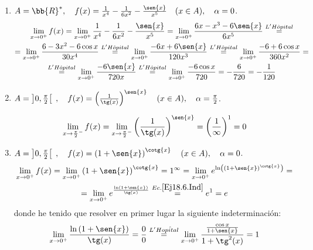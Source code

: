 \begin{ejercicio}
\begin{enumerate}
        \item $A = \bb{R}^\ast,\quad f(x)=\frac{1}{x^4}-\frac{1}{6x^2}-\frac{\sen{x}}{x^5}\quad (x\in A),\quad \alpha = 0$.
        \begin{multline*}
            \lim_{x\to0^+}f(x)
            =\lim_{x\to0^+}\frac{1}{x^4}-\frac{1}{6x^2}-\frac{\sen{x}}{x^5}
            = \lim_{x\to0^+} \frac{6x-x^3-6\sen{x}}{6x^5}
            \stackrel{L'H\hat{o}pital}{=}\\=
            \lim_{x\to0^+} \frac{6-3x^2-6\cos{x}}{30x^4}
            \stackrel{L'H\hat{o}pital}{=}
            \lim_{x\to0^+} \frac{-6x+6\sen{x}}{120x^3}
            \stackrel{L'H\hat{o}pital}{=}
            \lim_{x\to0^+} \frac{-6+6\cos{x}}{360x^2}
            = \\ \stackrel{L'H\hat{o}pital}{=}
            \lim_{x\to0^+} \frac{-6\sen{x}}{720x}
            \stackrel{L'H\hat{o}pital}{=}
            \lim_{x\to0^+} \frac{-6\cos{x}}{720} = -\frac{6}{720} = -\frac{1}{120}
        \end{multline*}
        

        \item $A = \left] 0, \frac{\pi}{2}\right[\;,\quad f(x)=\left(\frac{1}{\tg(x)}\right)^{\sen{x}}\quad (x\in A),\quad \alpha = \frac{\pi}{2}$.

        \begin{equation*}
            \lim_{x\to \frac{\pi}{2}^-}f(x)
            = \lim_{x\to \frac{\pi}{2}^-}\left(\frac{1}{\tg(x)}\right)^{\sen{x}} = \left( \frac{1}{\infty} \right)^1 = 0
        \end{equation*}       

        \item $A = \left] 0, \frac{\pi}{2}\right[\;,\quad f(x)=\left(1+\sen{x}\right)^{\cotg{x}}\quad (x\in A),\quad \alpha = 0$.
        \begin{multline*}
            \lim_{x\to 0^+}f(x)
            = \lim_{x\to 0^+}\left(1+\sen{x}\right)^{\cotg{x}} = 1^\infty =
            \lim_{x\to 0^+}e^{\ln\left(\left(1+\sen{x}\right)^{\cotg{x}}\right)} =\\
            = \lim_{x\to 0^+}e^{\frac{\ln\left(1+\sen{x}\right)}{\tg(x)}} \stackrel{Ec. \ref{Ej18.6.Ind}}{=} e^1 = e
        \end{multline*}
        donde he tenido que resolver en primer lugar la siguiente indeterminación:
        \begin{equation}\label{Ej18.6.Ind}
            \lim_{x\to 0^+}\frac{\ln\left(1+\sen{x}\right)}{\tg(x)} = \frac{0}{0} \stackrel{L'H\hat{opital}}{=}
            \lim_{x\to 0^+}\frac{\frac{\cos{x}}{1+\sen{x}}}{1+\tg^2(x)} = 1
        \end{equation}


\end{enumerate}
\end{ejercicio}
